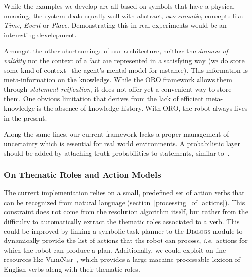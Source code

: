 \documentclass{svmult}
\newcommand{\ie}{{\textit{i.e.~}}}
\begin{document}
While the examples we develop are all based on symbols that have a physical
meaning, the system deals equally well with abstract, \emph{exo-somatic},
concepts like \emph{Time}, \emph{Event} or \emph{Place}. Demonstrating this in
real experiments would be an interesting development.

Amongst the other shortcomings of our architecture, neither the \emph{domain of
validity} nor the context of a fact are represented in a satisfying way (we do
store some kind of context --the agent's mental model for instance). This
information is meta-information on the knowledge. While the ORO framework
allows them through \emph{statement reification}, it does not offer yet a
convenient way to store them. One obvious limitation that derives from the lack
of efficient meta-knowledge is the absence of knowledge history.  With ORO, the
robot always lives in the present.

Along the same lines, our current framework lacks a proper management of
uncertainty which is essential for real world environments. A probabilistic
layer should be added by attaching truth probabilities to statements, similar
to~\cite{Jain2009}.

% 
% 
% 
% 
% 

\subsubsection{On Thematic Roles and Action Models}

The current implementation relies on a small, predefined set of action verbs that can
be recognized from natural language (section~\ref{processing_of_actions}).
This constraint does not come from the resolution algorithm itself, but
rather from the difficulty to automatically extract the thematic roles associated
to a verb. 
This could be improved by linking a symbolic task
planner to the \textsc{Dialogs} module to dynamically provide the list of
actions that the robot can process, \ie actions for which the robot can produce
a plan. Additionally, we could exploit on-line resources like
\textsc{VerbNet}~\cite{Kipper2008}, which provides a large machine-processable
lexicon of English verbs along with their thematic roles.
\end{document}
